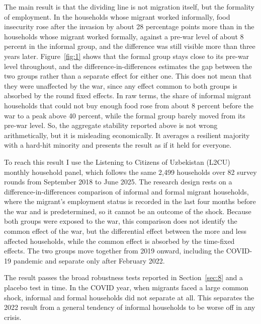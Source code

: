 The main result is that the dividing line is not migration itself, but the formality of employment. In the households whose migrant worked informally, food insecurity rose after the invasion by about 28 percentage points more than in the households whose migrant worked formally, against a pre-war level of about 8 percent in the informal group, and the difference was still visible more than three years later. Figure~\ref{fig:1} shows that the formal group stays close to its pre-war level throughout, and the difference-in-differences estimates the gap between the two groups rather than a separate effect for either one. This does not mean that they were unaffected by the war, since any effect common to both groups is absorbed by the round fixed effects. In raw terms, the share of informal migrant households that could not buy enough food rose from about 8 percent before the war to a peak above 40 percent, while the formal group barely moved from its pre-war level. So, the aggregate stability reported above is not wrong arithmetically, but it is misleading economically. It averages a resilient majority with a hard-hit minority and presents the result as if it held for everyone.

To reach this result I use the Listening to Citizens of Uzbekistan (L2CU) monthly household panel, which follows the same 2,499 households over 82 survey rounds from September 2018 to June 2025. The research design rests on a difference-in-differences comparison of informal and formal migrant households, where the migrant's employment status is recorded in the last four months before the war and is predetermined, so it cannot be an outcome of the shock. Because both groups were exposed to the war, this comparison does not identify the common effect of the war, but the differential effect between the more and less affected households, while the common effect is absorbed by the time-fixed effects. The two groups move together from 2019 onward, including the COVID-19 pandemic and separate only after February 2022.

The result passes the broad robustness tests reported in Section~\ref{sec:8} and a placebo test in time. In the COVID year, when migrants faced a large common shock, informal and formal households did not separate at all. This separates the 2022 result from a general tendency of informal households to be worse off in any crisis.

